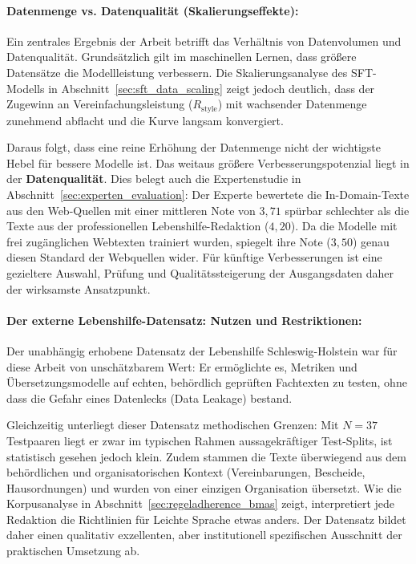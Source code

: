 \paragraph{Datenmenge vs. Datenqualität (Skalierungseffekte):}
Ein zentrales Ergebnis der Arbeit betrifft das Verhältnis von Datenvolumen und Datenqualität. Grundsätzlich gilt im maschinellen Lernen, dass größere Datensätze die Modellleistung verbessern. Die Skalierungsanalyse des SFT-Modells in Abschnitt~\ref{sec:sft_data_scaling} zeigt jedoch deutlich, dass der Zugewinn an Vereinfachungsleistung ($R_{\text{style}}$) mit wachsender Datenmenge zunehmend abflacht und die Kurve langsam konvergiert. 

Daraus folgt, dass eine reine Erhöhung der Datenmenge nicht der wichtigste Hebel für bessere Modelle ist. Das weitaus größere Verbesserungspotenzial liegt in der \textbf{Datenqualität}. Dies belegt auch die Expertenstudie in Abschnitt~\ref{sec:experten_evaluation}: Der Experte bewertete die In-Domain-Texte aus den Web-Quellen mit einer mittleren Note von $3{,}71$ spürbar schlechter als die Texte aus der professionellen Lebenshilfe-Redaktion ($4{,}20$). Da die Modelle mit frei zugänglichen Webtexten trainiert wurden, spiegelt ihre Note ($3{,}50$) genau diesen Standard der Webquellen wider. Für künftige Verbesserungen ist eine gezieltere Auswahl, Prüfung und Qualitätssteigerung der Ausgangsdaten daher der wirksamste Ansatzpunkt.

\paragraph{Der externe Lebenshilfe-Datensatz: Nutzen und Restriktionen:}
Der unabhängig erhobene Datensatz der Lebenshilfe Schleswig-Holstein war für diese Arbeit von unschätzbarem Wert: Er ermöglichte es, Metriken und Übersetzungsmodelle auf echten, behördlich geprüften Fachtexten zu testen, ohne dass die Gefahr eines Datenlecks (Data Leakage) bestand. 

Gleichzeitig unterliegt dieser Datensatz methodischen Grenzen: Mit $N=37$ Testpaaren liegt er zwar im typischen Rahmen aussagekräftiger Test-Splits, ist statistisch gesehen jedoch klein. Zudem stammen die Texte überwiegend aus dem behördlichen und organisatorischen Kontext (Vereinbarungen, Bescheide, Hausordnungen) und wurden von einer einzigen Organisation übersetzt. Wie die Korpusanalyse in Abschnitt~\ref{sec:regeladherence_bmas} zeigt, interpretiert jede Redaktion die Richtlinien für Leichte Sprache etwas anders. Der Datensatz bildet daher einen qualitativ exzellenten, aber institutionell spezifischen Ausschnitt der praktischen Umsetzung ab.

